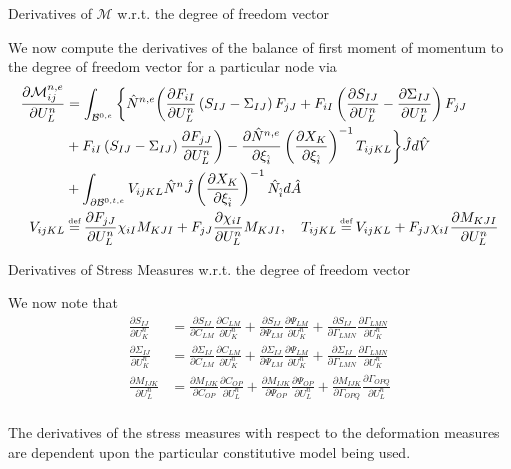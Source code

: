 \documentclass[11pt]{beamer}
\newcommand\defeq{\mathrel{\stackrel{\makebox[0pt]{\mbox{\normalfont\tiny def}}}{=}}}
\begin{document}
\begin{frame}{Derivatives of $\mathcal{M}$ w.r.t. the degree of freedom vector}

We now compute the derivatives of the balance of first moment of momentum to the degree of freedom vector for a particular node via
\begin{align*}
\frac{\partial \mathcal{M}_{ij}^{n,e}}{\partial U_{L}^n} &= \int_{\mathcal{B}^{0,e}} \bigg\{ \hat{N}^{n,e} \bigg(\frac{\partial F_{iI}}{\partial U_{L}^n} \left(S_{IJ}-\Sigma_{IJ}\right) F_{jJ} + F_{iI}\left(\frac{\partial S_{IJ}}{\partial U_L^n}-\frac{\partial \Sigma_{IJ}}{\partial U_L^n}\right) F_{jJ}\\
& +F_{iI} \left(S_{IJ}-\Sigma_{IJ}\right) \frac{\partial F_{jJ}}{\partial U_L^n}\bigg)  - \frac{\partial \hat{N}^{n,e}}{\partial \xi_{\hat{i}}} \left(\frac{\partial X_{K}}{\partial \xi_{\hat{i}}}\right)^{-1} T_{ijKL}\bigg\} \hat{J} d\hat{V}\\
& + \int_{\partial \mathcal{B}^{0,t,e}} V_{ijKL} \hat{N}^n \hat{J} \left(\frac{\partial X_{K}}{\partial \xi_{\hat{i}}}\right)^{-1} \hat{N}_{\hat{i}} d\hat{A}\\
V_{ijKL} &\defeq \frac{\partial F_{jJ}}{\partial U_{L}^n} \chi_{iI}  M_{KJI} + F_{jJ} \frac{\partial \chi_{iI}}{\partial U_{L}^n}  M_{KJI},\ \ \ T_{ijKL} \defeq V_{ijKL} + F_{jJ} \chi_{iI}  \frac{\partial M_{KJI}}{\partial U_{L}^n}\\
\end{align*}

\end{frame}

\begin{frame}{Derivatives of Stress Measures w.r.t. the degree of freedom vector}

We now note that
\begin{align*}
\frac{\partial S_{IJ}}{\partial U_{K}^n} &= \frac{\partial S_{IJ}}{\partial C_{LM}} \frac{\partial C_{LM}}{\partial U_{K}^n} + \frac{\partial S_{IJ}}{\partial \Psi_{LM}} \frac{\partial \Psi_{LM}}{\partial U_{K}^n} + \frac{\partial S_{IJ}}{\partial \Gamma_{LMN}} \frac{\partial \Gamma_{LMN}}{\partial U_{K}^n}\\
\frac{\partial \Sigma_{IJ}}{\partial U_{K}^n} &= \frac{\partial \Sigma_{IJ}}{\partial C_{LM}} \frac{\partial C_{LM}}{\partial U_{K}^n} + \frac{\partial \Sigma_{IJ}}{\partial \Psi_{LM}} \frac{\partial \Psi_{LM}}{\partial U_{K}^n} + \frac{\partial \Sigma_{IJ}}{\partial \Gamma_{LMN}} \frac{\partial \Gamma_{LMN}}{\partial U_{K}^n}\\
\frac{\partial M_{IJK}}{\partial U_{L}^n} &= \frac{\partial M_{IJK}}{\partial C_{OP}}\frac{\partial C_{OP}}{\partial U_L^n} + \frac{\partial M_{IJK}}{\partial \Psi_{OP}}\frac{\partial \Psi_{OP}}{\partial U_{L}^n} + \frac{\partial M_{IJK}}{\partial \Gamma_{OPQ}}\frac{\partial \Gamma_{OPQ}}{\partial U_{L}^n}\\
\end{align*}

The derivatives of the stress measures with respect to the deformation measures are dependent upon the particular constitutive model being used.

\end{frame}
\end{document}
